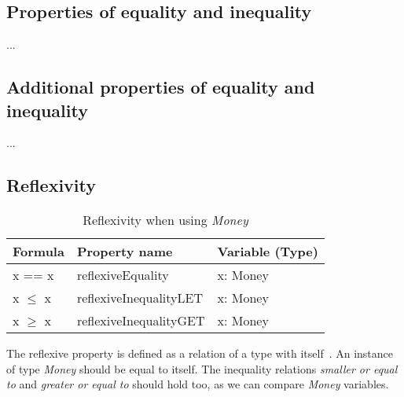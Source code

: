 \subsection{Properties of equality and inequality}
\label{ssct:properties_definitions_equalityproperties}
...

\subsection{Additional properties of equality and inequality}
\label{ssct:properties_definitions_additionalproperties}
...









\subsection*{Reflexivity}
\label{ssct:properties_reflexivity}
\FloatBarrier
\begin{table}[!ht]
\centering
\begin{tabular}{lll}
\hline
                        \textbf{Formula} & \textbf{Property name} & \textbf{Variable (Type)} \\ \hline
\rowcolor[HTML]{EFEFEF} x == x           & reflexiveEquality      & x: Money                 \\
                        x $\leq$ x       & reflexiveInequalityLET & x: Money                 \\
\rowcolor[HTML]{EFEFEF} x $\geq$ x       & reflexiveInequalityGET & x: Money                 \\ \hline
\end{tabular}
\caption{Reflexivity when using \textit{Money}}
\label{tbl:ch4_money_reflexivity}
\end{table}
\FloatBarrier
The reflexive property is defined as a relation of a type with
itself~\cite{raftery2011perspective}. An instance of type \textit{Money} should
be equal to itself. The inequality relations \textit{smaller or equal to} and
\textit{greater or equal to} should hold too, as we can compare \textit{Money}
variables.

